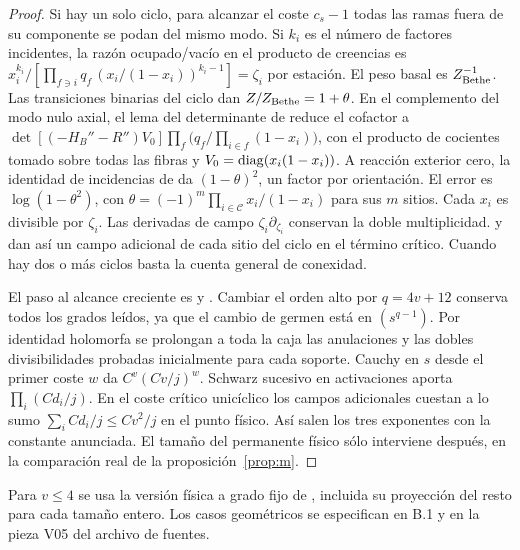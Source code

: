 \begin{proof}
Si hay un solo ciclo, para alcanzar el coste \(c_s-1\) todas las ramas fuera de su
componente se podan del mismo modo. Si \(k_i\) es el número de factores incidentes,
la razón ocupado/vacío en el producto de creencias es
\(x_i^{k_i}/[\prod_{f\ni i}q_f\,(x_i/(1-x_i))^{k_i-1}]=\zeta_i\) por estación.
El peso basal es \(Z_{\rm Bethe}^{-1}\). Las transiciones binarias del ciclo dan
\(Z/Z_{\rm Bethe}=1+\theta\). En el complemento del modo nulo axial, el lema
del determinante de  reduce el cofactor a
\(\det[(-H_B''-R'')V_0]\prod_f\bigl(q_f/\prod_{i\in f}(1-x_i)\bigr)\), con el producto
de cocientes tomado sobre todas las fibras y \(V_0=\operatorname{diag}(x_i(1-x_i))\).
A reacción exterior cero, la identidad de incidencias de  da
\((1-\theta)^2\), un factor por orientación. El error es \(\log(1-\theta^2)\),
con \(\theta=(-1)^m\prod_{i\in\mathcal C}x_i/(1-x_i)\) para sus \(m\) sitios.
Cada \(x_i\) es divisible por \(\zeta_i\). Las derivadas de campo
\(\zeta_i\partial_{\zeta_i}\) conservan la doble multiplicidad.  y
 dan así un campo adicional de cada sitio del ciclo en el término crítico.
Cuando hay dos o más ciclos basta la cuenta general de conexidad.

El paso al alcance creciente es  y . Cambiar el orden alto
por \(q=4v+12\) conserva todos los grados leídos, ya que el cambio de germen está en
\((s^{q-1})\). Por identidad holomorfa se prolongan a toda la caja las anulaciones y
las dobles divisibilidades probadas inicialmente para cada soporte. Cauchy en \(s\)
desde el primer coste \(w\) da \(C^v(Cv/j)^w\). Schwarz sucesivo en activaciones
aporta \(\prod_i(Cd_i/j)\). En el coste crítico unicíclico los campos adicionales
cuestan a lo sumo \(\sum_i Cd_i/j\le Cv^2/j\) en el punto físico.
Así salen los tres exponentes con la constante anunciada. El tamaño del permanente
físico sólo interviene después, en la comparación real de la proposición~\ref{prop:m}.
\end{proof}
Para \(v\le4\) se usa la versión física a grado fijo de , incluida su
proyección del resto para cada tamaño entero. Los casos geométricos se especifican
en B.1 y en la pieza V05 del archivo de fuentes.

